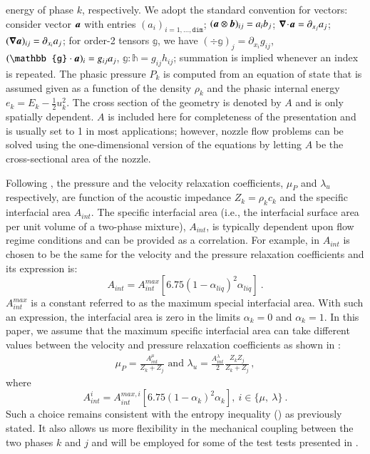 \documentclass[preprint,10pt]{elsarticle}
\begin{document}
energy of phase $k$, respectively. We adopt the standard convention for vectors: consider vector $\boldsymbol a$ with entries $(a_i)_{i=1,\ldots,\texttt{dim}}$; $
(\boldsymbol a \otimes \boldsymbol b)_{ij}=a_i b_j$;
$\boldsymbol\nabla\! \cdot \! \boldsymbol a= \partial_{x_j} a_j$; $(\boldsymbol\nabla \boldsymbol a)_{ij} = \partial_{x_i} a_j$; for order-2 tensors $\mathbb{g}$, 
we have $(\div \mathbb{g})_j = \partial_{x_i} g_{ij}$, $(\mathbb{g}\cdot \mbold{a})_i = g_{ij}a_j$, 
$\mathbb{g}:\mathbb{h} = g_{ij} h_{ij}$; summation is implied whenever an index is repeated. 
The phasic pressure $P_k$ is computed from an equation of state that is assumed given as a function of the density $\rho_k$ and 
the phasic internal energy $e_k = E_k - \tfrac{1}{2} u^2_k$. The cross section of the geometry is denoted by $A$ and is only 
spatially dependent. $A$ is included here for completeness of the presentation and is usually set to 1 in most applications; however, 
nozzle flow problems can be solved using the one-dimensional version of the equations by letting $A$ be the cross-sectional area 
of the nozzle. 

Following \cite{SEM}, the pressure and the velocity relaxation coefficients, $\mu_P$  and $\lambda_u$ respectively, are function of the acoustic 
impedance $Z_k = \rho_k c_k$ and the specific interfacial area $A_{int}$. The specific interfacial area (i.e., the interfacial surface area per unit
volume of a two-phase mixture), $A_{int}$, is typically dependent upon flow regime conditions and can be provided as a correlation. For example,
in \cite{SEM} $A_{int}$ is chosen to be the same for the velocity and the pressure relaxation coefficients and its expression is:
%
\begin{equation}\label{eq:Aint-def}
A_{int} = A_{int}^{max} \left[ 6.75 \left(1-\alpha_{liq} \right)^2 \alpha_{liq} \right] \ .
\end{equation}
% 
$A_{int}^{max}$ is a constant referred to as the maximum special interfacial area. %
With such an expression, the interfacial area is zero in the limits $\alpha_{k} = 0$ and $\alpha_{k} = 1$.
In this paper, we assume that the maximum specific interfacial area can take different values between the velocity and pressure relaxation 
coefficients as shown in :
%
\begin{subequations}
\label{eq:relaxation_coeff}
\begin{align}
  \label{E-R:86}
  \mu_P = \frac{A_{int}^\mu}{Z_{k}+Z_{j}} 
  \text{ and }
  \lambda_u = \frac{A_{int}^\lambda}{2}  \frac{Z_{k} Z_{j}}{Z_{k}+Z_{j}} \, ,
\end{align}
\end{subequations}
%
where
%
\begin{equation}\label{eq:Aint-sect4}
A_{int}^i = A_{int}^{max,i} \left[ 6.75 \left(1-\alpha_{k} \right)^2 \alpha_{k} \right] , \ i \in \{ \mu, \ \lambda \} \ .
\end{equation}
%
Such a choice remains consistent with the entropy inequality () as previously stated. It also allows us more 
flexibility in the mechanical coupling between the two phases $k$ and $j$ and will be employed for some of the test tests presented in .
\end{document}
